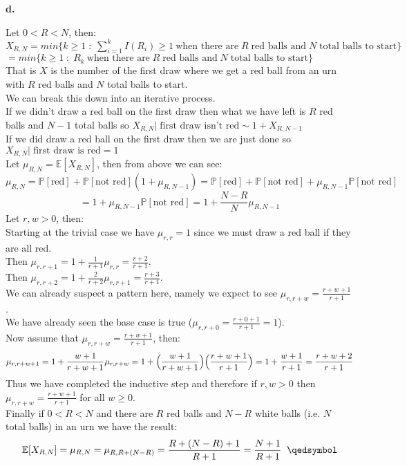 \documentclass{article}
\begin{document}
\newpage
{\Large\textbf{d.}}
\begin{center}
\doublespacing
    Let $0 < R < N$, then:
    \\$X_{R,N} = min\{k\geq 1\;:\;\sum_{i=1}^k I(R_i)\geq 1\:\mbox{when there are}\;R\;\mbox{red balls and}\;N\;\mbox{total balls to start}\}$
    \\$= min\{k\geq 1\;:\; R_k\:\mbox{when there are}\;R\;\mbox{red balls and}\;N\;\mbox{total balls to start}\}$
    \\That is $X$ is the number of the first draw where we get a red ball from an urn with $R$ red balls and $N$ total balls to start.
    \\We can break this down into an iterative process.
    \\If we didn't draw a red ball on the first draw then what we have left is $R$ red balls and $N-1$ total balls so $X_{R,N} |\;\mbox{first draw isn't red}\sim 1 + X_{R,N-1}$
    \\If we did draw a red ball on the first draw then we are just done so $X_{R,N} |\;\mbox{first draw is red} = 1$
    \\Let $\mu_{R,N} =\mathbb{E}[X_{R,N}]$, then from above we can see:
    \[\mu_{R,N} =\mathbb{P}[\mbox{red}] +\mathbb{P}[\mbox{not red}](1 +\mu_{R,N-1}) =\mathbb{P}[\mbox{red}] +\mathbb{P}[\mbox{not red}] +\mu_{R,N-1}\mathbb{P}[\mbox{not red}]\]
    \[= 1 +\mu_{R,N-1}\mathbb{P}[\mbox{not red}] = 1 +\frac{N-R}{N}\mu_{R,N-1}\]
    \break
    Let $r,w > 0$, then:
    \\Starting at the trivial case we have $\mu_{r,r} = 1$ since we must draw a red ball if they are all red.
    \\Then $\mu_{r,r+1} = 1 +\frac{1}{r+1}\mu_{r,r} =\frac{r+2}{r+1}$.
    \\Then $\mu_{r,r+2} = 1 +\frac{2}{r+2}\mu_{r,r+1} =\frac{r+3}{r+1}$.
    \break
    \\We can already suspect a pattern here, namely we expect to see $\mu_{r,r+w} =\frac{r+w+1}{r+1}$.
    \break
    \\We have already seen the base case is true ($\mu_{r,r+0} =\frac{r+0+1}{r+1} = 1$).
    \\Now assume that $\mu_{r,r+w} =\frac{r+w+1}{r+1}$, then:
    \[\mu_{r,r+w+1} = 1 +\frac{w+1}{r+w+1}\mu_{r,r+w} = 1 +\Big{(}\frac{w+1}{r+w+1}\Big{)}\Big{(}\frac{r+w+1}{r+1}\Big{)} = 1 +\frac{w+1}{r+1} =\frac{r+w+2}{r+1}\]
    Thus we have completed the inductive step and therefore if $r,w > 0$ then $\mu_{r,r+w} =\frac{r+w+1}{r+1}$ for all $w\geq 0$.
    \break
    \\Finally if $0 < R < N$ and there are $R$ red balls and $N-R$ white balls (i.e. $N$ total balls) in an urn we have the result:
    \[\mathbb{E}[X_{R,N}] =\mu_{R,N} =\mu_{R,R+(N-R)} =\frac{R+(N-R)+1}{R+1} =\frac{N+1}{R+1}\;\;\qedsymbol\]
\end{center}
\end{document}
